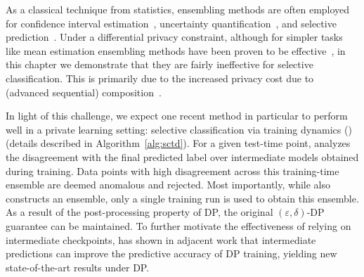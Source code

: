 As a classical technique from statistics, ensembling methods are often employed for confidence interval estimation~\citep{karwa2017finite, ferrando2022parametric}, uncertainty quantification~\citep{lakshminarayanan2017simple}, and selective prediction~\citep{zaoui2020regression}. Under a differential privacy constraint, although for simpler tasks like mean estimation ensembling methods have been proven to be effective~\citep{brawner2018bootstrap,covington2021unbiased,evans2019statistically}, in this chapter we demonstrate that they are fairly ineffective for selective classification. This is primarily due to the increased privacy cost due to (advanced sequential) composition~\citep{ dwork2006calibrating}. 

In light of this challenge, we expect one recent method in particular to perform well in a private learning setting: selective classification via training dynamics (\sctd)~\citep{rabanser2022selective} (details described in Algorithm~\ref{alg:sctd}). For a given test-time point, \sctd analyzes the disagreement with the final predicted label over intermediate models obtained during training. Data points with high disagreement across this training-time ensemble are deemed anomalous and rejected. Most importantly, while \sctd also constructs an ensemble, only a single training run is used to obtain this ensemble. As a result of the post-processing property of DP, the original $(\varepsilon, \delta)$-DP guarantee can be maintained. To further motivate the effectiveness of relying on intermediate checkpoints, \citet{shejwalkar2022recycling} has shown in adjacent work that intermediate predictions can improve the predictive accuracy of DP training, yielding new state-of-the-art results under DP. 

 
